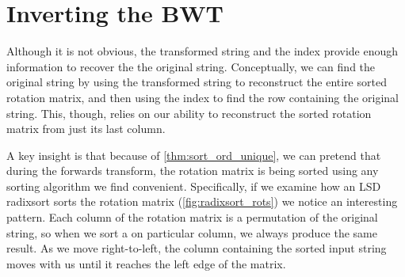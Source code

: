 \documentclass[sigplan,10pt,anonymous,review]{thesis}
\begin{document}
\section{Inverting the BWT}
\label{sec:invert_bwt}

Although it is not obvious, the transformed string and the index
provide enough information to recover the the original string.
Conceptually, we can find the original string by using the transformed
string to reconstruct the entire sorted rotation matrix, and then
using the index to find the row containing the original string. This,
though, relies on our ability to reconstruct the sorted rotation
matrix from just its last column.

A key insight is that because of \cref{thm:sort_ord_unique}, we can
pretend that during the forwards transform, the rotation matrix is
being sorted using any sorting algorithm we find convenient.
Specifically, if we examine how an LSD radixsort sorts the rotation
matrix (\cref{fig:radixsort_rots}) we notice an interesting pattern.
Each column of the rotation matrix is a permutation of the original
string, so when we sort a on particular column, we always produce the
same result. As we move right-to-left, the column containing the
sorted input string moves with us until it reaches the left edge of
the matrix.
\end{document}
